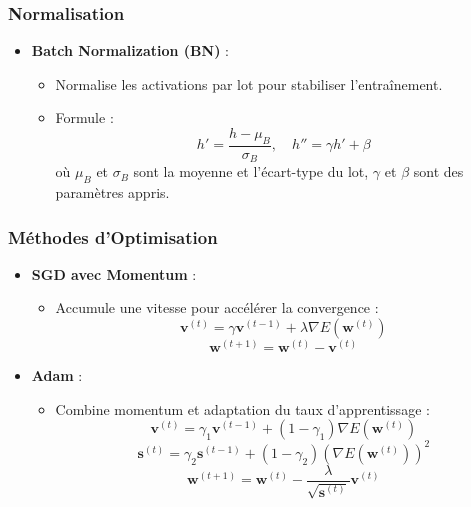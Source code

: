 \documentclass[a4paper,portrait]{article}
\begin{document}
\begin{multicols}{2}
\subsubsection{Normalisation}

\begin{itemize}
    \item \textbf{Batch Normalization (BN)} :
    \begin{itemize}
        \item Normalise les activations par lot pour stabiliser l'entraînement.
        \item Formule :
        \[
        h' = \frac{h - \mu_B}{\sigma_B}, \quad h'' = \gamma h' + \beta
        \]
        où \( \mu_B \) et \( \sigma_B \) sont la moyenne et l'écart-type du lot, \( \gamma \) et \( \beta \) sont des paramètres appris.
    \end{itemize}
\end{itemize}



\subsubsection{Méthodes d'Optimisation}

\begin{itemize}
    \item \textbf{SGD avec Momentum} :
    \begin{itemize}
        \item Accumule une vitesse pour accélérer la convergence :
        \[
        \mathbf{v}^{(t)} = \gamma \mathbf{v}^{(t-1)} + \lambda \nabla E(\mathbf{w}^{(t)})
        \]
        \[
        \mathbf{w}^{(t+1)} = \mathbf{w}^{(t)} - \mathbf{v}^{(t)}
        \]
    \end{itemize}

    \item \textbf{Adam} :
    \begin{itemize}
        \item Combine momentum et adaptation du taux d'apprentissage :
        \[
        \mathbf{v}^{(t)} = \gamma_1 \mathbf{v}^{(t-1)} + (1 - \gamma_1) \nabla E(\mathbf{w}^{(t)})
        \]
        \[
        \mathbf{s}^{(t)} = \gamma_2 \mathbf{s}^{(t-1)} + (1 - \gamma_2) (\nabla E(\mathbf{w}^{(t)}))^2
        \]
        \[
        \mathbf{w}^{(t+1)} = \mathbf{w}^{(t)} - \frac{\lambda}{\sqrt{\mathbf{s}^{(t)}}} \mathbf{v}^{(t)}
        \]
    \end{itemize}
\end{itemize}




\end{multicols}
\end{document}
